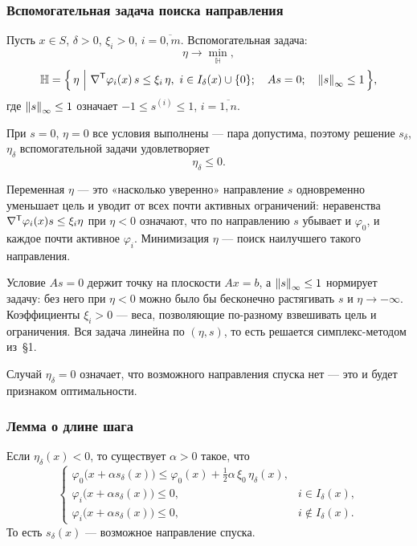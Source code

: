 \subsubsection*{Вспомогательная задача поиска направления}

Пусть $x \in S$, $\delta > 0$, $\xi_i > 0$, $i = \overline{0,m}$.
Вспомогательная задача:
\[
  \eta \longrightarrow \min_{\mathbb{H}} ,
\]
\[
  \mathbb{H} = \Big\{\, \eta \ \Big|\
    \nabla^{\mathsf{T}}\varphi_i(x)\, s \le \xi_i\, \eta,\ i \in I_\delta(x) \cup \{0\} ;
    \quad A s = 0 ; \quad \left\lVert s \right\rVert_\infty \le 1 \,\Big\} ,
\]
где $\left\lVert s \right\rVert_\infty \le 1$ означает
$-1 \le s^{(i)} \le 1$, $i = \overline{1,n}$.

При $s = 0$, $\eta = 0$ все условия выполнены — пара допустима, поэтому решение
$s_\delta$, $\eta_\delta$ вспомогательной задачи удовлетворяет
\[
  \eta_\delta \le 0 .
\]

\begin{idea}
Переменная $\eta$ — это «насколько уверенно» направление $s$ одновременно
уменьшает цель и уводит от всех почти активных ограничений: неравенства
$\nabla^{\mathsf{T}}\varphi_i(x)s \le \xi_i\eta$ при $\eta < 0$ означают, что по направлению
$s$ убывает и $\varphi_0$, и каждое почти активное $\varphi_i$. Минимизация
$\eta$ — поиск наилучшего такого направления.

Условие $As = 0$ держит точку на плоскости $Ax = b$, а $\left\lVert s \right\rVert_\infty \le 1$
нормирует задачу: без него при $\eta < 0$ можно было бы бесконечно растягивать
$s$ и $\eta \to -\infty$. Коэффициенты $\xi_i > 0$ — веса, позволяющие
по-разному взвешивать цель и ограничения. Вся задача линейна по $(\eta, s)$,
то есть решается симплекс-методом из~\S1.

Случай $\eta_\delta = 0$ означает, что возможного направления спуска нет — это
и будет признаком оптимальности.
\end{idea}

\subsubsection*{Лемма о длине шага}

\begin{lemma}\label{lem:zoutendijk-step}
Если $\eta_\delta(x) < 0$, то существует $\alpha > 0$ такое, что
\begin{equation}\label{eq:zout-goal}
  \begin{cases}
    \varphi_0\big(x + \alpha s_\delta(x)\big)
      \le \varphi_0(x) + \tfrac12 \alpha\, \xi_0\, \eta_\delta(x) , \\[4pt]
    \varphi_i\big(x + \alpha s_\delta(x)\big) \le 0 , & i \in I_\delta(x) , \\[4pt]
    \varphi_i\big(x + \alpha s_\delta(x)\big) \le 0 , & i \notin I_\delta(x) .
  \end{cases}
\end{equation}
То есть $s_\delta(x)$ — возможное направление спуска.
\end{lemma}

